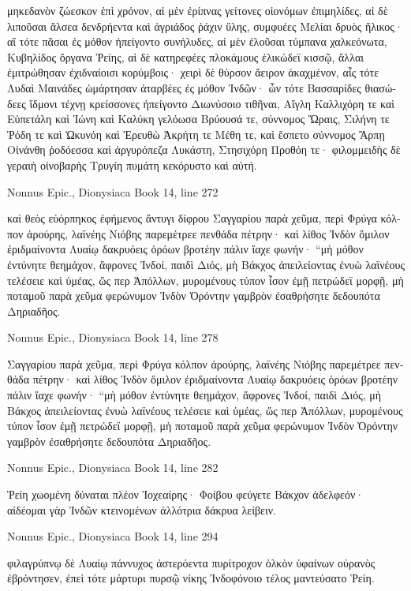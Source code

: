 \documentclass[12pt,letterpaper,twoside,final]{memoir}
\begin{document}
\begin{greek}
μηκεδανὸν ζώεσκον ἐπὶ χρόνον, αἱ μὲν ἐρίπνας 
γείτονες οἰονόμων ἐπιμηλίδες, αἱ δὲ λιποῦσαι 
ἄλσεα δενδρήεντα καὶ ἀγριάδος ῥάχιν ὕλης, 
συμφυέες Μελίαι δρυὸς ἥλικος· αἳ τότε πᾶσαι 
ἐς μόθον ἠπείγοντο συνήλυδες, αἱ μὲν ἑλοῦσαι 
τύμπανα χαλκεόνωτα, Κυβηλίδος ὄργανα Ῥείης,   
αἱ δὲ κατηρεφέες πλοκάμους ἑλικώδεϊ κισσῷ, 
ἄλλαι ἐμιτρώθησαν ἐχιδναίοισι κορύμβοις· 
χειρὶ δὲ θύρσον ἄειρον ἀκαχμένον, αἷς τότε Λυδαὶ 
Μαινάδες ὡμάρτησαν ἀταρβέες ἐς μόθον Ἰνδῶν· 
ὧν τότε Βασσαρίδες θιασώδεες ἴδμονι τέχνῃ 
κρείσσονες ἠπείγοντο Διωνύσοιο τιθῆναι, 
Αἴγλη Καλλιχόρη τε καὶ Εὐπετάλη καὶ Ἰώνη 
καὶ Καλύκη γελόωσα Βρύουσά τε, σύννομος Ὥραις, 
Σιλήνη τε Ῥόδη τε καὶ Ὠκυνόη καὶ Ἐρευθὼ 
Ἀκρήτη τε Μέθη τε, καὶ ἕσπετο σύννομος Ἅρπῃ 
Οἰνάνθη ῥοδόεσσα καὶ ἀργυρόπεζα Λυκάστη, 
Στησιχόρη Προθόη τε· φιλομμειδὴς δὲ γεραιὴ 
οἰνοβαρὴς Τρυγίη πυμάτη κεκόρυστο καὶ αὐτή. 



Nonnus Epic., Dionysiaca 
Book 14, line 272

καὶ θεὸς εὐόρπηκος ἐφήμενος ἄντυγι δίφρου 
Σαγγαρίου παρὰ χεῦμα, περὶ Φρύγα κόλπον ἀρούρης, 
λαϊνέης Νιόβης παρεμέτρεε πενθάδα πέτρην· 
καὶ λίθος Ἰνδὸν ὅμιλον ἐριδμαίνοντα Λυαίῳ 
δακρυόεις ὁρόων βροτέην πάλιν ἴαχε φωνήν· 
 “μὴ μόθον ἐντύνητε θεημάχον, ἄφρονες Ἰνδοί, 
παιδὶ Διός, μὴ Βάκχος ἀπειλείοντας ἐνυὼ   
λαϊνέους τελέσειε καὶ ὑμέας, ὥς περ Ἀπόλλων, 
μυρομένους τύπον ἶσον ἐμῇ πετρώδεϊ μορφῇ, 
μὴ ποταμοῦ παρὰ χεῦμα φερώνυμον Ἰνδὸν Ὀρόντην 
γαμβρὸν ἐσαθρήσητε δεδουπότα Δηριαδῆος. 



Nonnus Epic., Dionysiaca 
Book 14, line 278

Σαγγαρίου παρὰ χεῦμα, περὶ Φρύγα κόλπον ἀρούρης, 
λαϊνέης Νιόβης παρεμέτρεε πενθάδα πέτρην· 
καὶ λίθος Ἰνδὸν ὅμιλον ἐριδμαίνοντα Λυαίῳ 
δακρυόεις ὁρόων βροτέην πάλιν ἴαχε φωνήν· 
 “μὴ μόθον ἐντύνητε θεημάχον, ἄφρονες Ἰνδοί, 
παιδὶ Διός, μὴ Βάκχος ἀπειλείοντας ἐνυὼ   
λαϊνέους τελέσειε καὶ ὑμέας, ὥς περ Ἀπόλλων, 
μυρομένους τύπον ἶσον ἐμῇ πετρώδεϊ μορφῇ, 
μὴ ποταμοῦ παρὰ χεῦμα φερώνυμον Ἰνδὸν Ὀρόντην 
γαμβρὸν ἐσαθρήσητε δεδουπότα Δηριαδῆος. 



Nonnus Epic., Dionysiaca 
Book 14, line 282

Ῥείη χωομένη δύναται πλέον Ἰοχεαίρης· 
Φοίβου φεύγετε Βάκχον ἀδελφεόν· αἰδέομαι γὰρ 
Ἰνδῶν κτεινομένων ἀλλότρια δάκρυα λείβειν. 



Nonnus Epic., Dionysiaca 
Book 14, line 294

                         φιλαγρύπνῳ δὲ Λυαίῳ 
πάννυχος ἀστερόεντα πυρίτροχον ὁλκὸν ὑφαίνων 
οὐρανὸς ἐβρόντησεν, ἐπεὶ τότε μάρτυρι πυρσῷ 
νίκης Ἰνδοφόνοιο τέλος μαντεύσατο Ῥείη. 




\end{greek}
\end{document}
